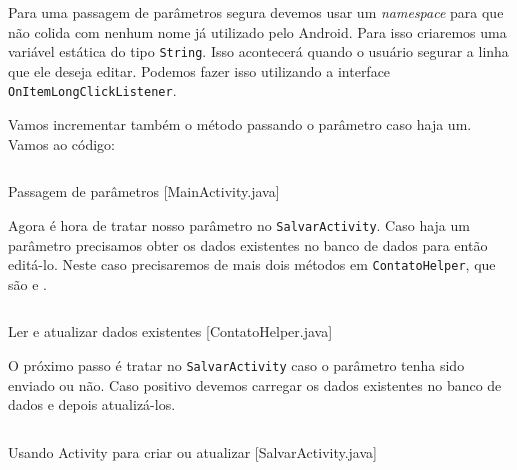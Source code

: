 Para uma passagem de parâmetros segura devemos usar um \textit{namespace} para que não colida com
nenhum nome já utilizado pelo Android. Para isso criaremos uma variável estática do tipo \texttt{String}.
Isso acontecerá quando o usuário segurar a linha que ele deseja editar. Podemos fazer isso utilizando
a interface \texttt{OnItemLongClickListener}.

Vamos incrementar também o método  passando o parâmetro caso haja um. Vamos ao
código:

\begin{listing}[H]
  \inputminted[linenos=true,frame=bottomline,tabsize=3]{ java }{ source/MainActivity-7.java }
  \caption{Passagem de parâmetros [MainActivity.java]}
\end{listing}

Agora é hora de tratar nosso parâmetro no \texttt{SalvarActivity}. Caso haja um parâmetro precisamos
obter os dados existentes no banco de dados para então editá-lo. Neste caso precisaremos de mais dois
métodos em \texttt{ContatoHelper}, que são  e .

\begin{listing}[H]
  \inputminted[linenos=true,frame=bottomline,tabsize=3]{ java }{ source/ContatoHelper-4.java }
  \caption{Ler e atualizar dados existentes [ContatoHelper.java]}
\end{listing}

O próximo passo é tratar no \texttt{SalvarActivity} caso o parâmetro tenha sido enviado ou não. Caso positivo
devemos carregar os dados existentes no banco de dados e depois atualizá-los.

\begin{listing}[H]
  \inputminted[linenos=true,frame=bottomline,tabsize=3]{ java }{ source/SalvarActivity-3.java }
  \caption{Usando Activity para criar ou atualizar [SalvarActivity.java]}
\end{listing}